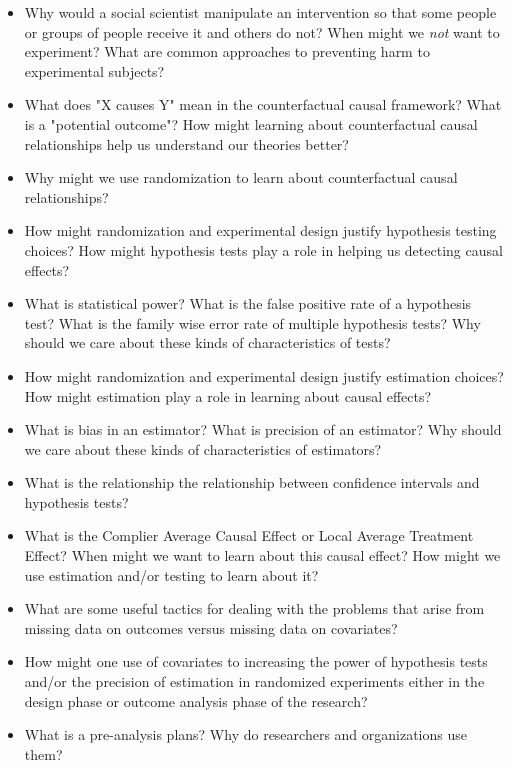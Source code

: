 \documentclass[letterpaper]{inzane_syllabus} %
\begin{document}
\begin{itemize}
    \item Why would a social scientist manipulate an intervention so that some
        people or groups of people receive it and others do not? When might we
        \emph{not} want to experiment?  What are common approaches to
        preventing harm to experimental subjects?
    \item What does "X causes Y" mean in the counterfactual causal framework?
        What is a "potential outcome"? How might learning about counterfactual
        causal relationships help us understand our theories better? 
    \item Why might we use randomization to learn about counterfactual causal
        relationships?
    \item How might randomization and experimental design justify hypothesis
        testing choices? How might hypothesis tests play a role in helping us
        detecting causal effects?
    \item What is statistical power? What is the false positive rate of a
        hypothesis test? What is the family wise error rate of multiple
        hypothesis tests? Why should we care about these kinds of
        characteristics of tests?
    \item How might randomization and experimental design justify estimation
        choices? How might estimation play a role in learning about causal
        effects?
    \item What is bias in an estimator? What is precision of an estimator? Why
        should we care about these kinds of characteristics of estimators?
    \item What is the relationship the relationship between confidence
        intervals and hypothesis tests?     
    \item What is the Complier Average Causal Effect or Local Average Treatment Effect? When might we want to learn about this causal effect? How might we use estimation and/or testing to learn about it?
    \item What are some useful tactics for dealing with the problems that arise from missing data on outcomes versus missing data on covariates?
    \item How might one use of covariates to increasing the power of hypothesis tests and/or the precision of estimation in randomized experiments either in the design phase or outcome analysis phase of the research?
    \item What is a pre-analysis plans? Why do researchers and organizations use them?
\end{itemize}
\end{document}
